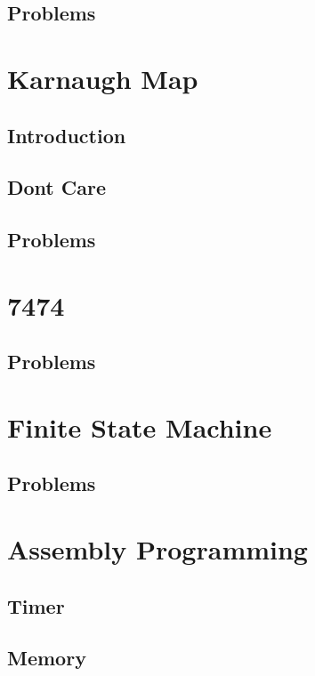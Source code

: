 \documentclass[11pt]{book}
\begin{document}
\section{Problems}

\chapter{Karnaugh Map}
\section{Introduction}

\section{Dont Care}

\section{Problems}

\chapter{7474}

\section{Problems}

\chapter{Finite State Machine}

\section{Problems}

\chapter{Assembly Programming}




\section{Timer}

\section{Memory}

\end{document}
